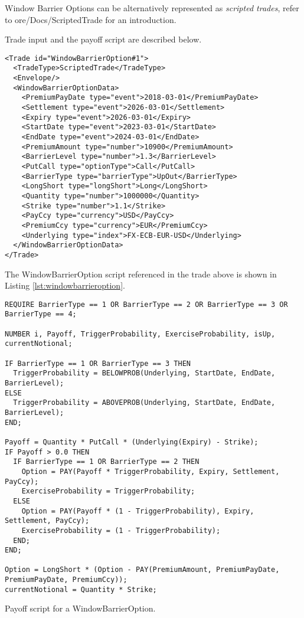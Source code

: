 
Window Barrier Options can be alternatively represented as {\em scripted trades}, refer to ore/Docs/ScriptedTrade
for an introduction.

Trade input and the payoff script are described below.

\begin{verbatim}
<Trade id="WindowBarrierOption#1">
  <TradeType>ScriptedTrade</TradeType>
  <Envelope/>
  <WindowBarrierOptionData>
    <PremiumPayDate type="event">2018-03-01</PremiumPayDate>
    <Settlement type="event">2026-03-01</Settlement>
    <Expiry type="event">2026-03-01</Expiry>
    <StartDate type="event">2023-03-01</StartDate>
    <EndDate type="event">2024-03-01</EndDate>
    <PremiumAmount type="number">10900</PremiumAmount>
    <BarrierLevel type="number">1.3</BarrierLevel>
    <PutCall type="optionType">Call</PutCall>
    <BarrierType type="barrierType">UpOut</BarrierType>
    <LongShort type="longShort">Long</LongShort>
    <Quantity type="number">1000000</Quantity>
    <Strike type="number">1.1</Strike>
    <PayCcy type="currency">USD</PayCcy>
    <PremiumCcy type="currency">EUR</PremiumCcy>
    <Underlying type="index">FX-ECB-EUR-USD</Underlying>
  </WindowBarrierOptionData>
</Trade>
\end{verbatim}

The WindowBarrierOption script referenced in the trade above is
shown in Listing \ref{lst:windowbarrieroption}.

\begin{listing}[hbt]
\begin{verbatim}
REQUIRE BarrierType == 1 OR BarrierType == 2 OR BarrierType == 3 OR BarrierType == 4;

NUMBER i, Payoff, TriggerProbability, ExerciseProbability, isUp, currentNotional;

IF BarrierType == 1 OR BarrierType == 3 THEN
  TriggerProbability = BELOWPROB(Underlying, StartDate, EndDate, BarrierLevel);
ELSE
  TriggerProbability = ABOVEPROB(Underlying, StartDate, EndDate, BarrierLevel);
END;

Payoff = Quantity * PutCall * (Underlying(Expiry) - Strike);
IF Payoff > 0.0 THEN
  IF BarrierType == 1 OR BarrierType == 2 THEN
    Option = PAY(Payoff * TriggerProbability, Expiry, Settlement, PayCcy);
    ExerciseProbability = TriggerProbability;
  ELSE
    Option = PAY(Payoff * (1 - TriggerProbability), Expiry, Settlement, PayCcy);
    ExerciseProbability = (1 - TriggerProbability);
  END;
END;

Option = LongShort * (Option - PAY(PremiumAmount, PremiumPayDate, PremiumPayDate, PremiumCcy));
currentNotional = Quantity * Strike;
\end{verbatim}
\caption{Payoff script for a WindowBarrierOption.}
\label{lst:windowbarrieroption}
\end{listing}

